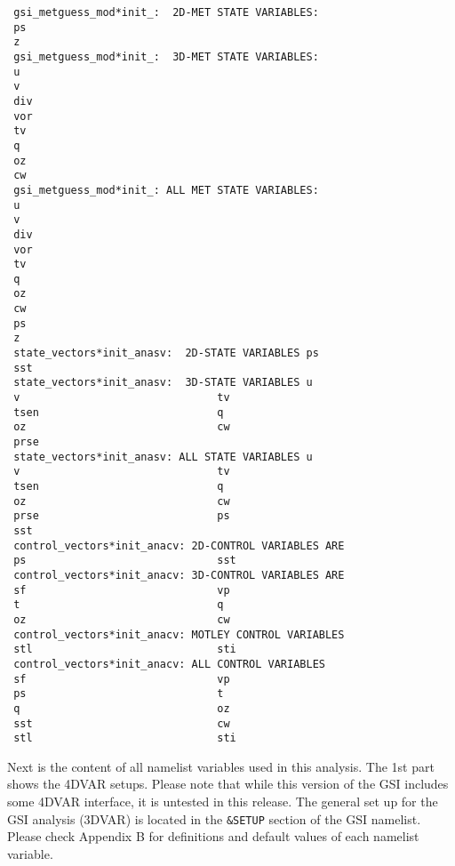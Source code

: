 \begin{scriptsize}
\begin{verbatim}
 gsi_metguess_mod*init_:  2D-MET STATE VARIABLES:
 ps
 z
 gsi_metguess_mod*init_:  3D-MET STATE VARIABLES:
 u
 v
 div
 vor
 tv
 q
 oz
 cw
 gsi_metguess_mod*init_: ALL MET STATE VARIABLES:
 u
 v
 div
 vor
 tv
 q
 oz
 cw
 ps
 z
 state_vectors*init_anasv:  2D-STATE VARIABLES ps
 sst
 state_vectors*init_anasv:  3D-STATE VARIABLES u
 v                               tv
 tsen                            q
 oz                              cw
 prse
 state_vectors*init_anasv: ALL STATE VARIABLES u
 v                               tv
 tsen                            q
 oz                              cw
 prse                            ps
 sst
 control_vectors*init_anacv: 2D-CONTROL VARIABLES ARE
 ps                              sst
 control_vectors*init_anacv: 3D-CONTROL VARIABLES ARE
 sf                              vp
 t                               q
 oz                              cw
 control_vectors*init_anacv: MOTLEY CONTROL VARIABLES
 stl                             sti
 control_vectors*init_anacv: ALL CONTROL VARIABLES
 sf                              vp
 ps                              t
 q                               oz
 sst                             cw
 stl                             sti
\end{verbatim}
\end{scriptsize}

Next is the content of all namelist variables used in this analysis. The 1st part shows the 4DVAR setups. Please note that while this version of the GSI includes some 4DVAR interface, it is untested in this release. The general set up for the GSI analysis (3DVAR) is located in the \verb|&SETUP| section of the GSI namelist. Please check Appendix B for definitions and default values of each namelist variable. 

